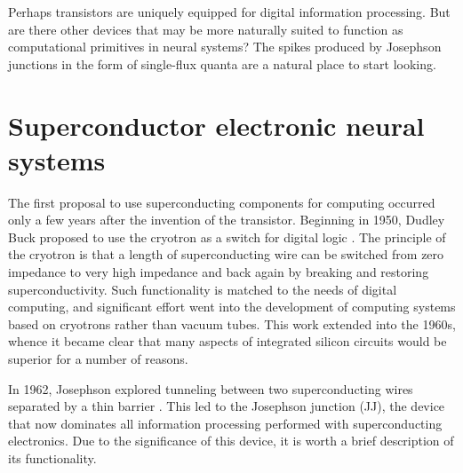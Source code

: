 \documentclass[twocolumn]{article}
\begin{document}
Perhaps transistors are uniquely equipped for digital information processing. But are there other devices that may be more naturally suited to function as computational primitives in neural systems? The spikes produced by Josephson junctions in the form of single-flux quanta are a natural place to start looking. 

\section{\label{sec:superconductors}Superconductor electronic neural systems}
The first proposal to use superconducting components for computing occurred only a few years after the invention of the transistor. Beginning in 1950, Dudley Buck proposed to use the cryotron as a switch for digital logic \cite{bu1956,bu1950}. The principle of the cryotron is that a length of superconducting wire can be switched from zero impedance to very high impedance and back again by breaking and restoring superconductivity. Such functionality is matched to the needs of digital computing, and significant effort went into the development of computing systems based on cryotrons rather than vacuum tubes. This work extended into the 1960s, whence it became clear that many aspects of integrated silicon circuits would be superior for a number of reasons. 

In 1962, Josephson explored tunneling between two superconducting wires separated by a thin barrier \cite{jo1962}. This led to the Josephson junction (JJ), the device that now dominates all information processing performed with superconducting electronics. Due to the significance of this device, it is worth a brief description of its functionality. 
\end{document}
